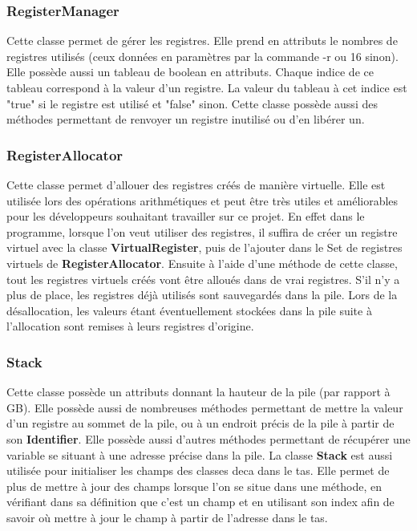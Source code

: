 \documentclass[12pt, a4paper, one side]{article}
\begin{document}
    \subsubsection{RegisterManager}

    Cette classe permet de gérer les registres. Elle prend en attributs le
    nombres de registres utilisés
    (ceux données en paramètres par la commande -r ou 16 sinon). Elle possède
    aussi un tableau de boolean
    en attributs. Chaque indice de ce tableau correspond à la valeur d'un
    registre. La valeur du tableau
    à cet indice est "true" si le registre est utilisé et "false" sinon. Cette
    classe possède aussi des
    méthodes permettant de renvoyer un registre inutilisé ou d'en libérer un.

    \subsubsection{RegisterAllocator}

    Cette classe permet d'allouer des registres créés de manière virtuelle.
    Elle est utilisée lors des opérations arithmétiques et peut être
    très utiles et améliorables pour les développeurs souhaitant travailler
    sur ce projet. En effet dans le programme, lorsque l'on veut utiliser
    des registres, il suffira de créer un registre virtuel avec la classe
    \textbf{VirtualRegister}, puis de l'ajouter dans le Set de registres
    virtuels de \textbf{RegisterAllocator}. Ensuite à l'aide d'une méthode
    de cette classe, tout les registres virtuels créés vont être alloués
    dans de vrai registres. S'il n'y a plus de place, les registres déjà
    utilisés sont sauvegardés dans la pile.
    Lors de la désallocation, les valeurs étant éventuellement stockées dans la
    pile suite à l'allocation sont remises à leurs registres d'origine.

    \subsubsection{Stack}

    Cette classe possède un attributs donnant la hauteur de la pile (par rapport
    à GB). Elle possède aussi
    de nombreuses méthodes permettant de mettre la valeur d'un registre au
    sommet de la pile, ou à un
    endroit précis de la pile à partir de son \textbf{Identifier}. Elle possède
    aussi d'autres méthodes permettant de récupérer une variable
    se situant à une adresse précise dans la pile.
    La classe \textbf{Stack} est aussi utilisée pour initialiser les champs
    des classes deca dans le tas. Elle permet de plus de mettre à jour des
    champs lorsque l'on se situe dans une méthode, en vérifiant dans sa
    définition que c'est un champ et en utilisant son index afin de savoir où
    mettre à jour le champ à partir de l'adresse dans le tas.
\end{document}
